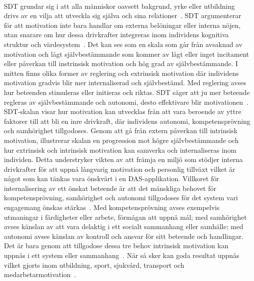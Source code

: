 \paragraph{}
\hspace{-12pt}SDT grundar sig i att alla människor oavsett bakgrund, yrke eller utbildning drivs av en vilja att utveckla sig själva och sina relationer~\cite{Cwil2018}.
SDT argumenterar för att motivation inte bara handlar om externa belöningar eller interna nöjen, utan snarare om hur dessa drivkrafter integreras inom individens kognitiva struktur och värdesystem~\cite{Cwil2018}.
Det kan ses som en skala som går från avsaknad av motivation och lågt självbestämmande som kommer av lågt eller inget incitament eller påverkan till instrinsisk motivation och hög grad av självbestämmande.
I mitten finns olika former av reglering och extrinsisk motivation där individens motivation gradvis blir mer internaliserad och självbestämd.
Med reglering avses hur beteenden stimuleras eller initieras och riktas.
SDT säger att ju mer beteende regleras av självbestämmande och autonomi, desto effektivare blir motivationen~\cite{Cwil2018}.
SDT-skalan visar hur motivation kan utvecklas från att vara beroende av yttre faktorer till att bli en inre drivkraft, där individens autonomi, kompetensprövning och samhörighet tillgodoses.
Genom att gå från extern påverkan till intrinsisk motivation, illustrerar skalan en progression mot högre självbestämmande och hur extrinsisk och intrinsisk motivation kan samverka och internaliseras inom individen.
Detta understryker vikten av att främja en miljö som stödjer interna drivkrafter för att uppnå långvarig motivation och personlig tillväxt vilket är något som kan tänkas vara önskvärt i en DAS-applikation.
Villkoret för internalisering av ett önskat beteende är att det mänskliga behovet för kompetensprövning, samhörighet och autonomi tillgodoses för det system vari engagemang önskas stärkas~\cite{Cwil2018}.
Med kompetensprövning avses exempelvis utmaningar i färdigheter eller arbete, förmågan att uppnå mål; med samhörighet avses känslan av att vara delaktig i ett socialt sammanhang eller samhälle; med autonomi avses känslan av kontroll och ansvar för sitt beteende och handlingar.
Det är bara genom att tillgodose dessa tre behov intrinsisk motivation kan uppnås i ett system eller sammanhang~\cite{Cwil2018}.
När så sker kan goda resultat uppnås vilket gjorts inom utbildning, sport, sjukvård, transport och medarbetarmotivation~\cite{Cwil2018}.
